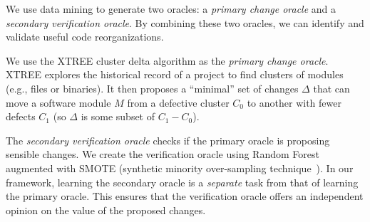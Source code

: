 \documentclass[twocolumn,5p]{elsarticle}
\theoremstyle{break}
\begin{document}
	We use data mining to generate two oracles: a {\em primary
		change oracle} and a {\em secondary verification oracle}.
	By combining these two oracles,
	we can identify and validate useful
	code reorganizations. 
	
	We use 
	the XTREE cluster delta algorithm as the {\em primary change  oracle}.
	XTREE 
	explores the historical record of a project to find clusters of modules (e.g., files or binaries).
	It then proposes a ``minimal'' set of changes $\Delta$ that can move a software module $M$ from a defective cluster $C_0$ to another with fewer defects $C_1$ (so $\Delta$
	is some subset of $C_1 - C_0$). %
	
	The {\em secondary verification oracle} checks if the primary oracle is proposing
	sensible changes. We create the verification oracle using Random Forest~\cite{breiman2001random} augmented with SMOTE (synthetic  minority over-sampling technique~\cite{chawla2002smote}).
	In our framework,  learning
	the secondary oracle is   a {\em separate} task from that of learning the primary
	oracle. This  ensures that the verification oracle offers an independent
	opinion on the value of the proposed changes.
	
\end{document}
